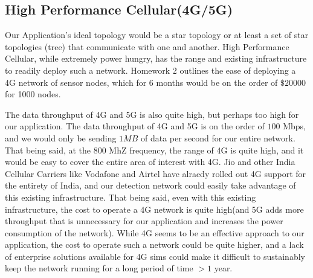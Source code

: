 \subsection{High Performance Cellular(4G/5G)}

Our Application's ideal topology would be a star topology or at least a set of star topologies (tree) that communicate with one and another. High Performance Cellular, while extremely power hungry, has the range and existing infrastructure to readily deploy such a network. Homework 2 outlines the ease of deploying a 4G network of sensor nodes, which for 6 months would be on the order of $\$20000$ for 1000 nodes. 

The data throughput of 4G and 5G is also quite high, but perhaps too high for our application. The data throughput of 4G and 5G is on the order of $100$ Mbps, and we would only be sending $1 MB$ of data per second for our entire network. That being said, at the 800 MhZ frequency, the range of 4G is quite high, and it would be easy to cover the entire area of interest with 4G. Jio and other India Cellular Carriers like Vodafone and Airtel have alraedy rolled out 4G support for the entirety of India, and our detection network could easily take advantage of this existing infrastructure. That being said, even with this existing infrastructure, the cost to operate a 4G network is quite high(and 5G adds more throughput that is unnecessary for our application and increases the power consumption of the network). While 4G seems to be an effective approach to our application, the cost to operate such a network could be quite higher, and a lack of enterprise solutions available for 4G sims could make it difficult to sustainably keep the network running for a long period of time $>1$ year.

